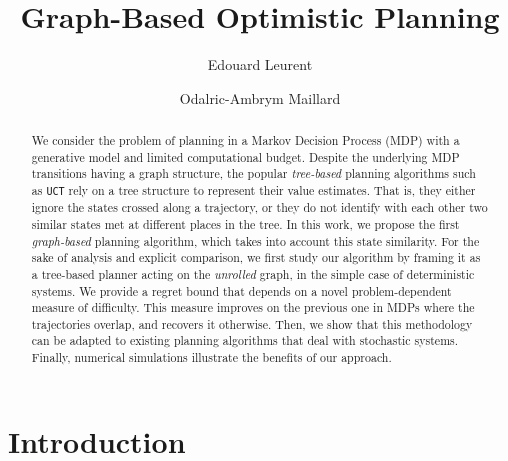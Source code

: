 \documentclass[runningheads]{llncs}
\begin{document}
\title{Graph-Based Optimistic Planning}
%
%
\author{Edouard Leurent\and Odalric-Ambrym Maillard}
%
%
%
\maketitle              %
%
\begin{abstract}
	We consider the problem of planning in a Markov Decision Process (MDP) with a generative model and limited computational budget. Despite the underlying MDP transitions having a graph structure, the popular \emph{tree-based} planning algorithms such as \texttt{UCT} rely on a tree structure to represent their value estimates. That is, they either ignore the states crossed along a trajectory, or they do not identify with each other two similar states met at different places in the tree. In this work, we propose the first \emph{graph-based} planning algorithm, which takes into account this state similarity. For the sake of analysis and explicit comparison, we first study our algorithm by framing it as a tree-based planner acting on the \textit{unrolled} graph, in the simple case of deterministic systems. We provide a regret bound that depends on a novel problem-dependent measure of difficulty. This measure improves on the previous one in MDPs where the trajectories overlap, and recovers it otherwise. Then, we show that this methodology can be adapted to existing planning algorithms that deal with stochastic systems. Finally, numerical simulations illustrate the benefits of our approach.
	
\end{abstract}
%
%
%

\section{Introduction}
\end{document}
